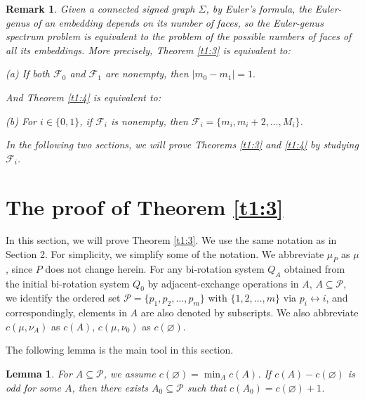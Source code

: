\documentclass[10pt,a4paper]{amsart}
\newtheorem{lemma}[theorem]{Lemma}
\newtheorem{remark}[theorem]{Remark}
\begin{document}
\begin{remark}\label{re2:16}
Given a connected signed graph $\Sigma$, by Euler's formula, the Euler-genus of an embedding depends on its number of faces, so the Euler-genus spectrum problem is equivalent to the problem of the possible numbers of faces of all its embeddings. More precisely, Theorem \ref{t1:3} is equivalent to:
\begin{center}
(a) If both $\mathcal F_0$ and $\mathcal F_1$ are nonempty, then $|m_0-m_1|=1.$
\end{center}
And Theorem \ref{t1:4} is equivalent to:
\begin{center}
(b) For $i\in\{0,1\}$, if $\mathcal F_i$ is nonempty, then $\mathcal F_i=\{m_i, m_i+2, \ldots, M_i\}$.\end{center}
In the following two sections, we will prove Theorems \ref{t1:3} and \ref{t1:4} by studying $\mathcal F_i$.
\end{remark}


\section{The proof of  Theorem \ref{t1:3}}\label{Sec:3}
In this section, we will prove Theorem \ref{t1:3}. We use the same notation as in Section 2. For simplicity, we simplify some of the notation. We abbreviate $\mu_P$ as $\mu$, since $P$ does not change herein. For any bi-rotation system $Q_A$ obtained from the initial bi-rotation system $Q_0$ by adjacent-exchange operations in $A$, $A\subseteq\mathcal P$, we identify the ordered set $\mathcal P=\{p_1,p_2,\ldots,p_m\}$ with $\{1,2,\ldots,m\}$ via $p_i\leftrightarrow i$,
and correspondingly, elements in
$A$ are also denoted by subscripts.
We also abbreviate $c(\mu,\nu_A)$ as $c(A)$, $c(\mu,\nu_0)$ as $c(\varnothing)$.

The following lemma is the main tool in this section.

\begin{lemma}
\label{lem3:1}
For $A\subseteq \mathcal P$, we assume $c(\varnothing)=\min_A c(A)$. If $c(A)-c(\varnothing)$ is odd for some $A$, then there exists $A_0\subseteq\mathcal P$ such that $c(A_0)=c(\varnothing)+1$.
\end{lemma}
\end{document}

